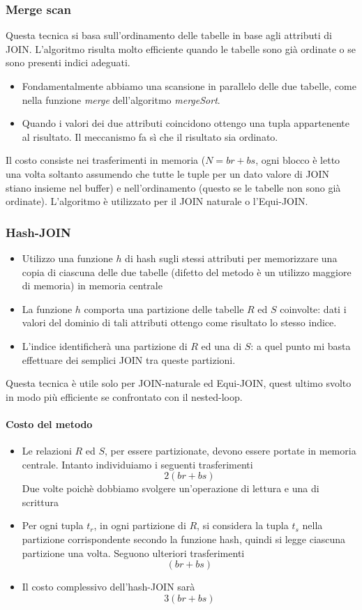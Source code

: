 \subsubsection{Merge scan}
Questa tecnica si basa sull'ordinamento delle tabelle in base agli attributi di JOIN. L'algoritmo risulta molto efficiente quando le tabelle sono già ordinate o se sono presenti indici adeguati. 
\begin{itemize}
	\item Fondamentalmente abbiamo una scansione in parallelo delle due tabelle, come nella funzione \emph{merge} dell'algoritmo \emph{mergeSort}.
	\item Quando i valori dei due attributi coincidono ottengo una tupla appartenente al risultato. Il meccanismo fa sì che il risultato sia ordinato.
\end{itemize}
Il costo consiste nei trasferimenti in memoria ($N=br+bs$, ogni blocco è letto una volta soltanto assumendo che tutte le tuple per un dato valore di JOIN stiano insieme nel buffer) e nell'ordinamento (questo se le tabelle non sono già ordinate). L'algoritmo è utilizzato per il JOIN naturale o l'Equi-JOIN. 

\subsubsection{Hash-JOIN}
\begin{itemize}
	\item Utilizzo una funzione $h$ di hash sugli stessi attributi per memorizzare una copia di ciascuna delle due tabelle (difetto del metodo è un utilizzo maggiore di memoria) in memoria centrale
	\item La funzione $h$ comporta una partizione delle tabelle $R$ ed $S$ coinvolte: dati i valori del dominio di tali attributi ottengo come risultato lo stesso indice.
	\item L'indice identificherà una partizione di $R$ ed una di $S$: a quel punto mi basta effettuare dei semplici JOIN tra queste partizioni.
\end{itemize}
Questa tecnica è utile solo per JOIN-naturale ed Equi-JOIN, quest ultimo svolto in modo più efficiente se confrontato con il nested-loop.
\paragraph{Costo del metodo} 
\begin{itemize}
	\item Le relazioni $R$ ed $S$, per essere partizionate, devono essere portate in memoria centrale. Intanto individuiamo i seguenti trasferimenti
	\[2(br+bs)\]
	Due volte poichè dobbiamo svolgere un'operazione di lettura e una di scrittura
	\item Per ogni tupla $t_r$, in ogni partizione di $R$, si considera la tupla $t_s$ nella partizione corrispondente secondo la funzione hash, quindi si legge ciascuna partizione una volta. Seguono ulteriori trasferimenti
	\[(br+bs)\]
	\item Il costo complessivo dell'hash-JOIN sarà
	\[3(br+bs)\]
\end{itemize}
\pagebreak

